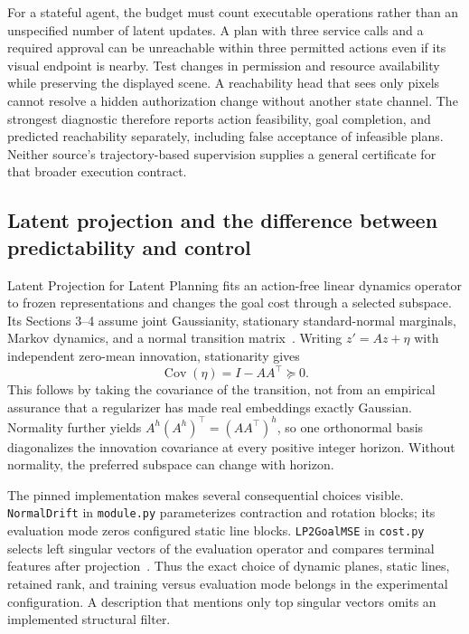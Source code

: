 For a stateful agent, the budget must count executable operations rather than an unspecified number of latent updates. A plan with three service calls and a required approval can be unreachable within three permitted actions even if its visual endpoint is nearby. Test changes in permission and resource availability while preserving the displayed scene. A reachability head that sees only pixels cannot resolve a hidden authorization change without another state channel. The strongest diagnostic therefore reports action feasibility, goal completion, and predicted reachability separately, including false acceptance of infeasible plans. Neither source's trajectory-based supervision supplies a general certificate for that broader execution contract.

\subsection{Latent projection and the difference between predictability and control}
\label{sec:C05:projection}
Latent Projection for Latent Planning fits an action-free linear dynamics operator to frozen representations and changes the goal cost through a selected subspace. Its Sections 3--4 assume joint Gaussianity, stationary standard-normal marginals, Markov dynamics, and a normal transition matrix~\cite{rewrite_latentprojection2026}. Writing $z'=Az+\eta$ with independent zero-mean innovation, stationarity gives
\begin{equation}
 \operatorname{Cov}(\eta)=I-AA^\top\succeq0.
\end{equation}
This follows by taking the covariance of the transition, not from an empirical assurance that a regularizer has made real embeddings exactly Gaussian. Normality further yields $A^h(A^h)^\top=(AA^\top)^h$, so one orthonormal basis diagonalizes the innovation covariance at every positive integer horizon. Without normality, the preferred subspace can change with horizon.

The pinned implementation makes several consequential choices visible. \texttt{NormalDrift} in \texttt{module.py} parameterizes contraction and rotation blocks; its evaluation mode zeros configured static line blocks. \texttt{LP2GoalMSE} in \texttt{cost.py} selects left singular vectors of the evaluation operator and compares terminal features after projection~\cite{rewrite_lp2_repo}. Thus the exact choice of dynamic planes, static lines, retained rank, and training versus evaluation mode belongs in the experimental configuration. A description that mentions only top singular vectors omits an implemented structural filter.

